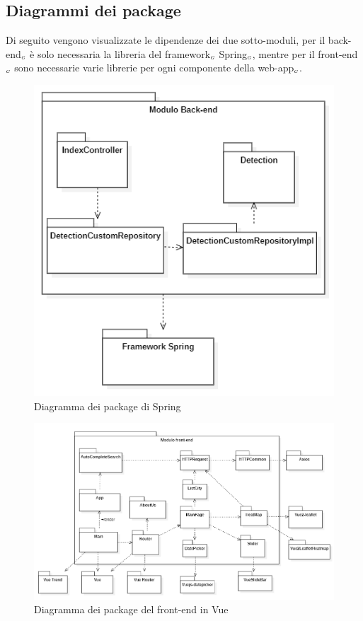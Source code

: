 \subsection{Diagrammi dei package}\label{ArchitetturaModuloWebAppDiagrammiDeiPackage}
Di seguito vengono visualizzate le dipendenze dei due sotto-moduli, per il back-end$_{\scaleto{G}{3pt}}$ è solo necessaria la libreria del framework$_{\scaleto{G}{3pt}}$ Spring$_{\scaleto{G}{3pt}}$, mentre per il front-end$_{\scaleto{G}{3pt}}$ sono necessarie varie librerie per ogni componente della web-app$_{\scaleto{G}{3pt}}$.
\begin{figure}[H]
  \begin{center}
    \includegraphics[scale=0.8]{../immagini/diag_PB/diag_pack_spring.png}
    \caption{Diagramma dei package di Spring}
  \end{center}
\end{figure}

\begin{figure}[H]
  \begin{center}
    \includegraphics[scale=0.65]{../immagini/diag_PB/diag_pack_vue.png}
    \caption{Diagramma dei package del front-end in Vue}
  \end{center}
\end{figure}

